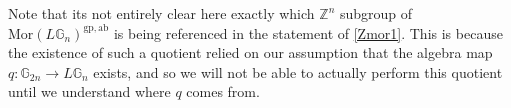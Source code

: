 Note that its not entirely clear here exactly which $\mathbb{Z}^n$ subgroup of $\mathrm{Mor}(L\mathbb{G}_n)^{\mathrm{gp, ab}}$ is being referenced in the statement of \cref{Zmor1}. This is because the existence of such a quotient relied on our assumption that the algebra map $q: \mathbb{G}_{2n} \to L\mathbb{G}_n$ exists, and so we will not be able to actually perform this quotient until we understand where $q$ comes from.
